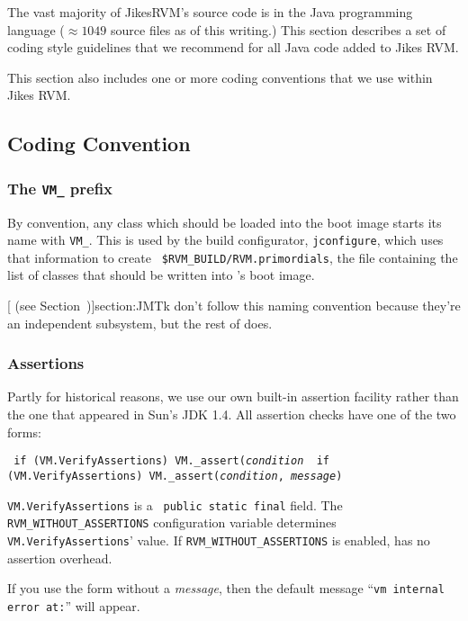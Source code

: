 The vast majority of Jikes\TMweb RVM's source code is in the Java\TMweb
programming language ($\approx 1049$
source files as of this writing.)  This section describes a set of
coding style guidelines that we recommend for all Java code added to
Jikes RVM.

This section also includes one or more coding conventions that we
use within Jikes RVM.  

\subsection{Coding Convention}

\subsubsection{The {\tt VM\_} prefix}

By convention, any class which should be loaded into the boot image
starts its name with {\tt VM\_}.  This is used by the build configurator,
{\tt jconfigure}, which uses that information to create {\tt
\$RVM\_BUILD/RVM.primordials}, the file containing the list of classes
that should be written into \jrvm{}'s  boot image.

[ (see Section~\Ref)]{section:JMTk} don't follow this naming convention
because they're an independent subsystem, but the rest of \jrvm{} does.

\subsubsection{Assertions}
\label{assertions}

Partly for historical reasons, we use our own built-in assertion
facility rather than the one that appeared in Sun\Rweb{}'s JDK 1.4.   All
assertion checks have one of the two forms:
\begin{example}
\tt{}    if (VM.VerifyAssertions)  VM._assert({\it condition}
\tt{}    if (VM.VerifyAssertions)  VM._assert({\it condition}, {\it message})
\end{example}
{\tt VM.VerifyAssertions} is a {\tt 
public static final} field.  The {\tt RVM\_WITHOUT\_ASSERTIONS}
configuration variable determines {\tt VM.VerifyAssertions}' value.
If {\tt RVM\_WITHOUT\_ASSERTIONS} is enabled, \jrvm{} has no assertion
overhead. 

If you use the form without a {\it message}, then the default message
``{\tt vm internal error at:}''  will appear.  

